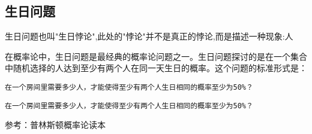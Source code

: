 
\subsection{生日问题}

生日问题也叫"生日悖论",此处的"悖论"并不是真正的悖论,而是描述一种现象:人

在概率论中，生日问题是最经典的概率论问题之一。生日问题探讨的是在一个集合中随机选择的人达到至少有两个人在同一天生日的概率。这个问题的标准形式是：

\begin{lstlisting}[language=none]
在一个房间里需要多少人，才能使得至少有两个人生日相同的概率至少为50%？
\end{lstlisting}


\verb`在一个房间里需要多少人，才能使得至少有两个人生日相同的概率至少为50%？`
 







参考：普林斯顿概率论读本